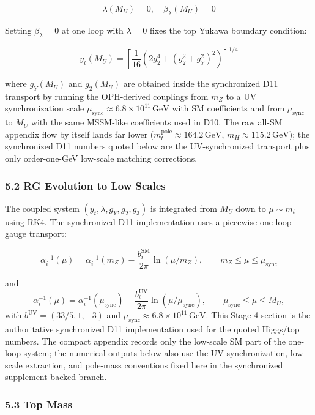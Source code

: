 \[\lambda(M_U) = 0, \quad \beta_\lambda(M_U) = 0\]

Setting \(\beta_\lambda = 0\) at one loop with \(\lambda = 0\) fixes the top Yukawa boundary condition:

\[y_t(M_U) = \left[\frac{1}{16}\left(2g_2^4 + (g_2^2 + g_Y^2)^2\right)\right]^{1/4}\]

where \(g_Y(M_U)\) and \(g_2(M_U)\) are obtained inside the synchronized D11 transport by running the OPH-derived couplings from \(m_Z\) to a UV synchronization scale \(\mu_{\mathrm{sync}}\approx 6.8\times 10^{11}\,\mathrm{GeV}\) with SM coefficients and from \(\mu_{\mathrm{sync}}\) to \(M_U\) with the same MSSM-like coefficients used in D10. The raw all-SM appendix flow by itself lands far lower (\(m_t^{\mathrm{pole}}\approx 164.2\,\mathrm{GeV}\), \(m_H\approx 115.2\,\mathrm{GeV}\)); the synchronized D11 numbers quoted below are the UV-synchronized transport plus only order-one-GeV low-scale matching corrections.

\subsubsection{5.2 RG Evolution to Low Scales}\label{52-rg-evolution-to-low-scales}

The coupled system \((y_t, \lambda, g_Y, g_2, g_3)\) is integrated from \(M_U\) down to \(\mu \sim m_t\) using RK4. The synchronized D11 implementation uses a piecewise one-loop gauge transport:

\[\alpha_i^{-1}(\mu) = \alpha_i^{-1}(m_Z) - \frac{b_i^{\text{SM}}}{2\pi}\ln(\mu/m_Z), \qquad m_Z \le \mu \le \mu_{\mathrm{sync}}\]

and
\[\alpha_i^{-1}(\mu) = \alpha_i^{-1}(\mu_{\mathrm{sync}}) - \frac{b_i^{\text{UV}}}{2\pi}\ln(\mu/\mu_{\mathrm{sync}}), \qquad \mu_{\mathrm{sync}} \le \mu \le M_U,\]
with \(b^{\text{UV}}=(33/5,1,-3)\) and \(\mu_{\mathrm{sync}}\approx 6.8\times 10^{11}\,\mathrm{GeV}\). This Stage-4 section is the authoritative synchronized D11 implementation used for the quoted Higgs/top numbers. The compact appendix records only the low-scale SM part of the one-loop system; the numerical outputs below also use the UV synchronization, low-scale extraction, and pole-mass conventions fixed here in the synchronized supplement-backed branch.

\subsubsection{5.3 Top Mass}\label{53-top-mass}

